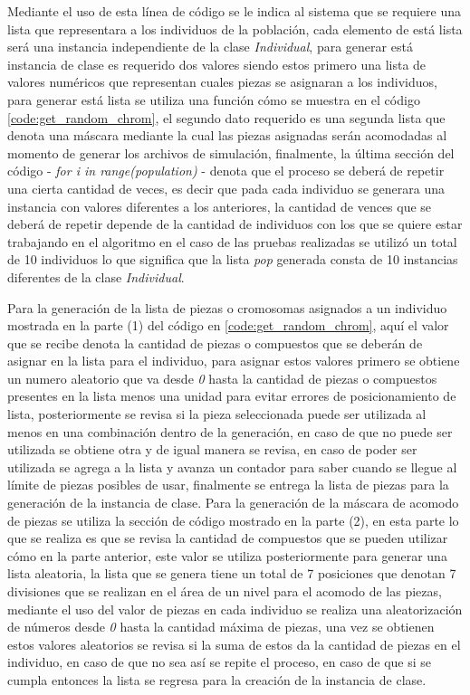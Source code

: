 Mediante el uso de esta línea de código se le indica al sistema que se requiere
una lista que representara a los individuos de la población, cada elemento de
está lista será una instancia independiente de la clase \textit{Individual},
para generar está instancia de clase es requerido dos valores siendo estos
primero una lista de valores numéricos que representan cuales piezas se
asignaran a los individuos, para generar está lista se utiliza una función cómo
se muestra en el código \ref{code:get_random_chrom}, el segundo dato requerido
es una segunda lista que denota una máscara mediante la cual las piezas
asignadas serán acomodadas al momento de generar los archivos de simulación,
finalmente, la última sección del código - \textit{for i in range(population)} -
denota que el proceso se deberá de repetir una cierta cantidad de veces, es
decir que pada cada individuo se generara una instancia con valores diferentes a
los anteriores, la cantidad de vences que se deberá de repetir depende de la
cantidad de individuos con los que se quiere estar trabajando en el algoritmo en
el caso de las pruebas realizadas se utilizó un total de 10 individuos lo que
significa que la lista \textit{pop} generada consta de 10 instancias diferentes
de la clase \textit{Individual}. 

Para la generación de la lista de piezas o cromosomas asignados a un individuo
mostrada en la parte (1) del código en \ref{code:get_random_chrom}, aquí el
valor que se recibe denota la cantidad de piezas o compuestos que se deberán de
asignar en la lista para el individuo, para asignar estos valores primero se
obtiene un numero aleatorio que va desde \textit{0} hasta la cantidad de piezas o
compuestos presentes en la lista menos una unidad para evitar errores de
posicionamiento de lista, posteriormente se revisa si la pieza seleccionada
puede ser utilizada al menos en una combinación dentro de la generación, en caso
de que no puede ser utilizada se obtiene otra y de igual manera se revisa, en
caso de poder ser utilizada se agrega a la lista y avanza un contador para saber
cuando se llegue al límite de piezas posibles de usar, finalmente se entrega la
lista de piezas para la generación de la instancia de clase. Para la generación
de la máscara de acomodo de piezas se utiliza la sección de código mostrado en
la parte (2), en esta parte lo que se realiza es que se revisa la cantidad de
compuestos que se pueden utilizar cómo en la parte anterior, este valor se
utiliza posteriormente para generar una lista aleatoria, la lista que se genera
tiene un total de 7 posiciones que denotan 7 divisiones que se realizan en el
área de un nivel para el acomodo de las piezas, mediante el uso del valor de
piezas en cada individuo se realiza una aleatorización de números desde
\textit{0} hasta la cantidad máxima de piezas, una vez se obtienen estos valores
aleatorios se revisa si la suma de estos da la cantidad de piezas en el
individuo, en caso de que no sea así se repite el proceso, en caso de que si se
cumpla entonces la lista se regresa para la creación de la instancia de clase.

